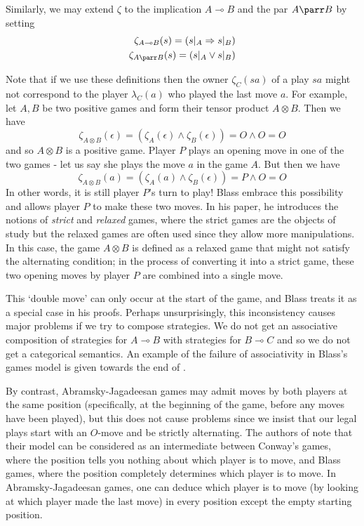 \documentclass[11pt]{article} %
\theoremstyle{plain} %
\theoremstyle{definition} %
\theoremstyle{note}
\theoremstyle{exercisestyle}
\newcommand{\tensor}{\otimes}
\renewcommand{\implies}{\multimap}
\newcommand{\emptyplay}{\epsilon}
\begin{document}
Similarly, we may extend $\zeta$ to the implication $A\implies B$ and the par $A\parr B$ by setting
\begin{align*}
  \zeta_{A\implies B}(s)=(s\vert_A\Rightarrow s\vert_B)\\
  \zeta_{A\parr B}(s) = (s\vert_A \vee s\vert_B)
\end{align*}

Note that if we use these definitions then the owner $\zeta_C(sa)$ of a play $sa$ might not correspond to the player $\lambda_C(a)$ who played the last move $a$.  For example, let $A,B$ be two positive games and form their tensor product $A\tensor B$.  Then we have
\[
  \zeta_{A\tensor B}(\emptyplay) = (\zeta_A(\emptyplay) \wedge \zeta_B(\emptyplay)) = O \wedge O = O
  \]
and so $A\tensor B$ is a positive game.  Player $P$ plays an opening move in one of the two games - let us say she plays the move $a$ in the game $A$.  But then we have
\[
  \zeta_{A\tensor B}(a) = (\zeta_A(a) \wedge \zeta_B(\emptyplay)) = P \wedge O = O
  \]
In other words, it is still player $P$'s turn to play!  Blass embrace this possibility and allows player $P$ to make these two moves.  In his paper, he introduces the notions of \emph{strict} and \emph{relaxed} games, where the strict games are the objects of study but the relaxed games are often used since they allow more manipulations.  In this case, the game $A\tensor B$ is defined as a relaxed game that might not satisfy the alternating condition; in the process of converting it into a strict game, these two opening moves by player $P$ are combined into a single move.

This `double move' can only occur at the start of the game, and Blass treats it as a special case in his proofs.  Perhaps unsurprisingly, this inconsistency causes major problems if we try to compose strategies.  We do not get an associative composition of strategies for $A\implies B$ with strategies for $B\implies C$ and so we do not get a categorical semantics.  An example of the failure of associativity in Blass's games model is given towards the end of \cite{abramskyjagadeesangames}.

By contrast, Abramsky-Jagadeesan games may admit moves by both players at the same position (specifically, at the beginning of the game, before any moves have been played), but this does not cause problems since we insist that our legal plays start with an $O$-move and be strictly alternating.  The authors of \cite{abramskyjagadeesangames} note that their model can be considered as an intermediate between Conway's games, where the position tells you nothing about which player is to move, and Blass games, where the position completely determines which player is to move.  In Abramsky-Jagadeesan games, one can deduce which player is to move (by looking at which player made the last move) in every position except the empty starting position.
\end{document}
